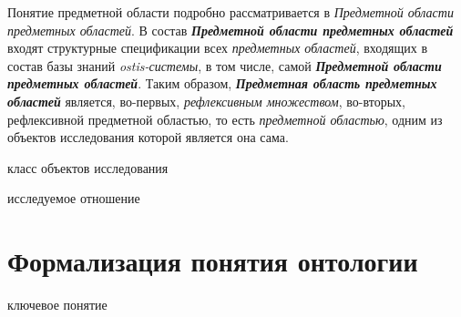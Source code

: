 Понятие предметной области подробно рассматривается в \textit{Предметной области предметных областей}. В состав \textbf{\textit{Предметной области предметных областей}} входят структурные спецификации всех \textit{предметных областей}, входящих в состав базы знаний \textit{ostis-системы}, в том числе, самой \textbf{\textit{Предметной области предметных областей}}. Таким образом, \textbf{\textit{Предметная область предметных областей}} является, во-первых, \textit{рефлексивным множеством}, во-вторых, рефлексивной предметной областью, то есть \textit{предметной областью}, одним из объектов исследования которой является она сама.

\begin{SCn}
	\begin{scnhaselementrolelist}{класс объектов исследования}
	\end{scnhaselementrolelist}
	\begin{scnhaselementrolelist}{исследуемое отношение}
	\end{scnhaselementrolelist}
\end{SCn}

\section{Формализация понятия онтологии}
\label{sec_ontology}

\begin{SCn}
	\begin{scnrelfromlist}{ключевое понятие}
	\end{scnrelfromlist}
\end{SCn}


